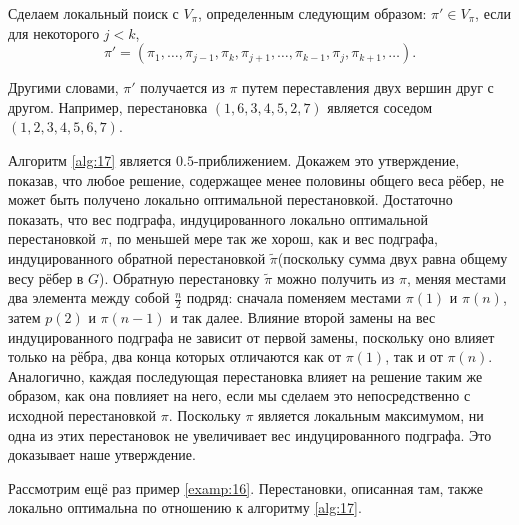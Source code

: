\documentclass[a4paper, 12pt, oneside]{extarticle}  %
\begin{document}
\begin{algo}\label{alg:17}
  Сделаем локальный поиск с $V_{\pi}$, определенным следующим образом: $\pi' \in V_{\pi}$, если для некоторого $j < k$,
  \[\pi' = (\pi_1, \ldots, \pi_{j-1}, \pi_k, \pi_{j+1}, \ldots, \pi_{k-1}, \pi_j, \pi_{k+1}, \ldots).\]
\end{algo}

Другими словами, $\pi'$ получается из $\pi$ путем переставления двух вершин друг с другом.
Например, перестановка $(1, 6, 3, 4, 5, 2, 7)$ является соседом $(1, 2, 3, 4, 5, 6, 7)$.

Алгоритм \ref{alg:17} является $0.5$-приближением. Докажем это утверждение, показав, что любое решение, содержащее менее половины общего веса рёбер, не может быть получено локально оптимальной перестановкой. Достаточно показать, что вес подграфа, индуцированного локально оптимальной перестановкой $\pi$, по меньшей мере так же хорош, как и вес подграфа, индуцированного обратной перестановкой $\tilde{\pi}$(поскольку сумма двух равна общему весу рёбер в $G$). Обратную перестановку $\tilde{\pi}$ можно получить из $\pi$, меняя местами два элемента между собой $\frac{n}{2}$ подряд: сначала поменяем местами $\pi(1)$ и $\pi(n)$, затем $p(2)$ и $\pi(n-1)$ и так далее. Влияние второй замены на вес индуцированного подграфа не зависит от первой замены, поскольку оно влияет только на рёбра, два конца которых отличаются как от $\pi(1)$, так и от $\pi(n)$. Аналогично, каждая последующая перестановка влияет на решение таким же образом, как она
повлияет на него, если мы сделаем это непосредственно с исходной перестановкой $\pi$. Поскольку $\pi$ является локальным максимумом, ни одна из этих перестановок не увеличивает вес индуцированного подграфа. Это доказывает наше утверждение.

\begin{example}
  Рассмотрим ещё раз пример \ref{examp:16}. Перестановки, описанная там, также локально оптимальна по отношению к алгоритму \ref{alg:17}.
\end{example}
\end{document}
